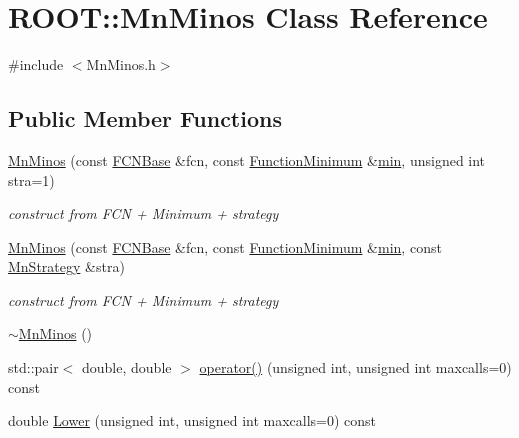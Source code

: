 \hypertarget{classROOT_1_1Minuit2_1_1MnMinos}{}\section{R\+O\+OT\+:\+:Mn\+Minos Class Reference}
\label{classROOT_1_1Minuit2_1_1MnMinos}


{\ttfamily \#include $<$Mn\+Minos.\+h$>$}

\subsection*{Public Member Functions}
\begin{DoxyCompactItemize}
\item 
\mbox{\hyperlink{classROOT_1_1Minuit2_1_1MnMinos_ac64ec75423efa6e473ee722f08f47eb4}{Mn\+Minos}} (const \mbox{\hyperlink{classROOT_1_1Minuit2_1_1FCNBase}{F\+C\+N\+Base}} \&fcn, const \mbox{\hyperlink{classROOT_1_1Minuit2_1_1FunctionMinimum}{Function\+Minimum}} \&\mbox{\hyperlink{adat__devel_2lib_2SU3_2SU3__internal_8h_ab0f5fed3171eb00d1c5f037d9f518a23}{min}}, unsigned int stra=1)
\begin{DoxyCompactList}\small\item\em construct from F\+CN + Minimum + strategy \end{DoxyCompactList}\item 
\mbox{\hyperlink{classROOT_1_1Minuit2_1_1MnMinos_a80f912ade0dd48d937bc04b14e28623c}{Mn\+Minos}} (const \mbox{\hyperlink{classROOT_1_1Minuit2_1_1FCNBase}{F\+C\+N\+Base}} \&fcn, const \mbox{\hyperlink{classROOT_1_1Minuit2_1_1FunctionMinimum}{Function\+Minimum}} \&\mbox{\hyperlink{adat__devel_2lib_2SU3_2SU3__internal_8h_ab0f5fed3171eb00d1c5f037d9f518a23}{min}}, const \mbox{\hyperlink{classROOT_1_1Minuit2_1_1MnStrategy}{Mn\+Strategy}} \&stra)
\begin{DoxyCompactList}\small\item\em construct from F\+CN + Minimum + strategy \end{DoxyCompactList}\item 
\mbox{\hyperlink{classROOT_1_1Minuit2_1_1MnMinos_a64625d0dd4308a7c8fb8930c980f11bd}{$\sim$\+Mn\+Minos}} ()
\item 
std\+::pair$<$ double, double $>$ \mbox{\hyperlink{classROOT_1_1Minuit2_1_1MnMinos_aa3605120b9628fe22416f723f25383b0}{operator()}} (unsigned int, unsigned int maxcalls=0) const
\item 
double \mbox{\hyperlink{classROOT_1_1Minuit2_1_1MnMinos_a0e6c6ab67bdd7b3461d900f64b4908ba}{Lower}} (unsigned int, unsigned int maxcalls=0) const

\end{DoxyCompactItemize}
